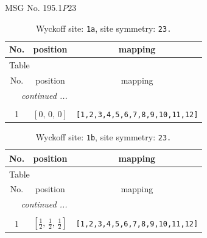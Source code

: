 \documentclass[fleqn,8pt]{jsarticle}
\begin{document}
\setcounter{MaxMatrixCols}{32}

\renewcommand{\tablename}{Table~}
\renewcommand{\figurename}{Figure~}
\begin{center}
\LARGE
MSG No. 195.1\quad$P23$
\end{center}
\renewcommand{\arraystretch}{1.2}
\begin{longtable}{ccc}
\caption{Wyckoff site: {\tt 1a}, site symmetry: {\tt 23.}}
 \\
 \hline \hline
No. & position & mapping \\ \hline \endfirsthead

\multicolumn{2}{l}{\tablename\ \thetable{}} \\
 \hline \hline
No. & position & mapping \\ \hline \endhead

 \hline \hline
\multicolumn{2}{r}{\footnotesize\it continued ...} \\ \endfoot

 \hline \hline
\multicolumn{2}{r}{} \\ \endlastfoot

1 & $\left[ 0,\, 0,\, 0 \right]$ & {\tt [1,2,3,4,5,6,7,8,9,10,11,12]} \\
\end{longtable}
\renewcommand{\arraystretch}{1.2}
\begin{longtable}{ccc}
\caption{Wyckoff site: {\tt 1b}, site symmetry: {\tt 23.}}
 \\
 \hline \hline
No. & position & mapping \\ \hline \endfirsthead

\multicolumn{2}{l}{\tablename\ \thetable{}} \\
 \hline \hline
No. & position & mapping \\ \hline \endhead

 \hline \hline
\multicolumn{2}{r}{\footnotesize\it continued ...} \\ \endfoot

 \hline \hline
\multicolumn{2}{r}{} \\ \endlastfoot

1 & $\left[ \frac{1}{2},\, \frac{1}{2},\, \frac{1}{2} \right]$ & {\tt [1,2,3,4,5,6,7,8,9,10,11,12]} \\
\end{longtable}
\renewcommand{\arraystretch}{1.2}
\end{document}
